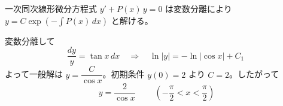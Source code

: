 
一次同次線形微分方程式 $y' + P(x)\,y = 0$ は変数分離により $y = C\exp\left(-\displaystyle\int P(x)\,dx\right)$ と解ける。

変数分離して
\[
\frac{dy}{y} = \tan x\,dx
\quad\Longrightarrow\quad
\ln|y| = -\ln|\cos x| + C_{1}
\]
よって一般解は $y = \dfrac{C}{\cos x}$。初期条件 $y(0) = 2$ より $C = 2$。したがって
\[
\boxed{\; y = \frac{2}{\cos x} \;}
\qquad \left(-\frac{\pi}{2} < x < \frac{\pi}{2}\right)
\]

